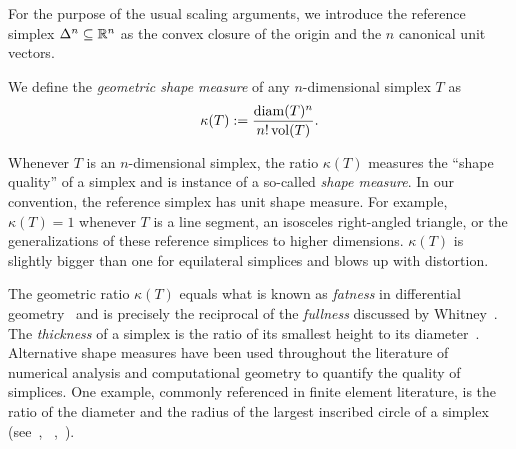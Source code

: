 \documentclass[12pt,a4paper]{article}
\begin{document}
For the purpose of the usual scaling arguments, we introduce the reference simplex $\Delta^n \subseteq {\mathbb R}^n$ as the convex closure of the origin and the $n$ canonical unit vectors. 

We define the \textit{geometric shape measure} of any $n$-dimensional simplex $T$ as 
\begin{align}\label{math:geometricshapemeasure}
    \kappa(T)
    := 
    \frac{ {\operatorname{diam}}(T)^{n} }{ n! \operatorname{vol}(T) }
    .
\end{align}

\begin{remark}
    Whenever $T$ is an $n$-dimensional simplex, the ratio $\kappa(T)$ measures the ``shape quality'' of a simplex and is instance of a so-called \emph{shape measure}.
    In our convention, the reference simplex has unit shape measure.
    For example, $\kappa(T)=1$ whenever $T$ is a line segment, an isosceles right-angled triangle, or the generalizations of these reference simplices to higher dimensions. $\kappa(T)$ is slightly bigger than one for equilateral simplices and blows up with distortion.

    The geometric ratio $\kappa(T)$ equals what is known as \emph{fatness} in differential geometry~\cite{cheeger1984curvature} and is precisely the reciprocal of the \emph{fullness} discussed by Whitney~\cite{whitney2012geometric}. 
    The \emph{thickness} of a simplex is the ratio of its smallest height to its diameter~\cite{munkres2016elementary}.
    Alternative shape measures have been used throughout the literature of numerical analysis and computational geometry to quantify the quality of simplices.
    One example, commonly referenced in finite element literature, is the ratio of the diameter and the radius of the largest inscribed circle of a simplex 
    (see~\cite[p.61, Definition 5.1]{braess2001finite}, ~\cite[p.97, Definition (4.2.16)]{brenner2008mathematical},~\cite[Definition~11.2]{ern2021finite}). 
\end{remark}
\end{document}
